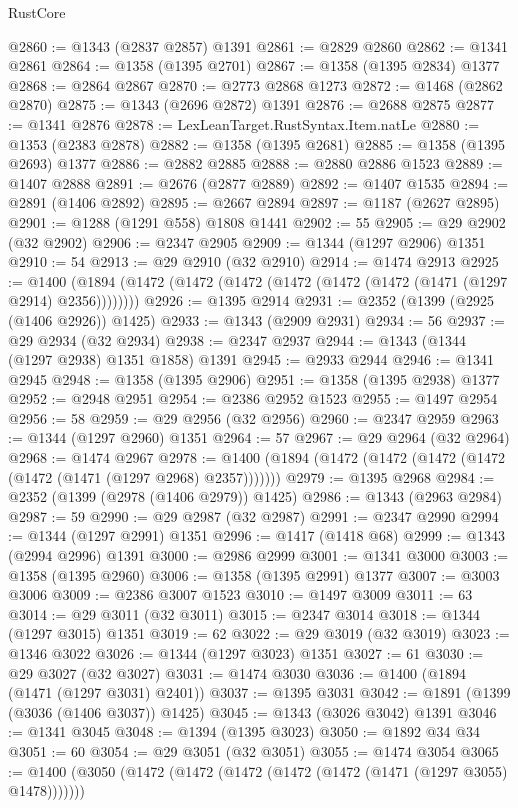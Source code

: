 \begin{lexlean}{RustCore}
\begin{coremodule}
{\begin{coremodule}
{{{{{{{{{{{{{{{{{{{{{{{{{{{{{{{{{{{{{{{{{{{{@2860 := @1343 (@2837 @2857) @1391
@2861 := @2829 @2860
@2862 := @1341 @2861
@2864 := @1358 (@1395 @2701)
@2867 := @1358 (@1395 @2834) @1377
@2868 := @2864 @2867
@2870 := @2773 @2868 @1273
@2872 := @1468 (@2862 @2870)
@2875 := @1343 (@2696 @2872) @1391
@2876 := @2688 @2875
@2877 := @1341 @2876
@2878 := LexLeanTarget.RustSyntax.Item.natLe
@2880 := @1353 (@2383 @2878)
@2882 := @1358 (@1395 @2681)
@2885 := @1358 (@1395 @2693) @1377
@2886 := @2882 @2885
@2888 := @2880 @2886 @1523
@2889 := @1407 @2888
@2891 := @2676 (@2877 @2889)
@2892 := @1407 @1535
@2894 := @2891 (@1406 @2892)
@2895 := @2667 @2894
@2897 := @1187 (@2627 @2895)
@2901 := @1288 (@1291 @558) @1808 @1441
@2902 := 55
@2905 := @29 @2902 (@32 @2902)
@2906 := @2347 @2905
@2909 := @1344 (@1297 @2906) @1351
@2910 := 54
@2913 := @29 @2910 (@32 @2910)
@2914 := @1474 @2913
@2925 := @1400 (@1894 (@1472 (@1472 (@1472 (@1472 (@1472 (@1472 (@1471 (@1297 @2914) @2356))))))))
@2926 := @1395 @2914
@2931 := @2352 (@1399 (@2925 (@1406 @2926)) @1425)
@2933 := @1343 (@2909 @2931)
@2934 := 56
@2937 := @29 @2934 (@32 @2934)
@2938 := @2347 @2937
@2944 := @1343 (@1344 (@1297 @2938) @1351 @1858) @1391
@2945 := @2933 @2944
@2946 := @1341 @2945
@2948 := @1358 (@1395 @2906)
@2951 := @1358 (@1395 @2938) @1377
@2952 := @2948 @2951
@2954 := @2386 @2952 @1523
@2955 := @1497 @2954
@2956 := 58
@2959 := @29 @2956 (@32 @2956)
@2960 := @2347 @2959
@2963 := @1344 (@1297 @2960) @1351
@2964 := 57
@2967 := @29 @2964 (@32 @2964)
@2968 := @1474 @2967
@2978 := @1400 (@1894 (@1472 (@1472 (@1472 (@1472 (@1472 (@1471 (@1297 @2968) @2357)))))))
@2979 := @1395 @2968
@2984 := @2352 (@1399 (@2978 (@1406 @2979)) @1425)
@2986 := @1343 (@2963 @2984)
@2987 := 59
@2990 := @29 @2987 (@32 @2987)
@2991 := @2347 @2990
@2994 := @1344 (@1297 @2991) @1351
@2996 := @1417 (@1418 @68)
@2999 := @1343 (@2994 @2996) @1391
@3000 := @2986 @2999
@3001 := @1341 @3000
@3003 := @1358 (@1395 @2960)
@3006 := @1358 (@1395 @2991) @1377
@3007 := @3003 @3006
@3009 := @2386 @3007 @1523
@3010 := @1497 @3009
@3011 := 63
@3014 := @29 @3011 (@32 @3011)
@3015 := @2347 @3014
@3018 := @1344 (@1297 @3015) @1351
@3019 := 62
@3022 := @29 @3019 (@32 @3019)
@3023 := @1346 @3022
@3026 := @1344 (@1297 @3023) @1351
@3027 := 61
@3030 := @29 @3027 (@32 @3027)
@3031 := @1474 @3030
@3036 := @1400 (@1894 (@1471 (@1297 @3031) @2401))
@3037 := @1395 @3031
@3042 := @1891 (@1399 (@3036 (@1406 @3037)) @1425)
@3045 := @1343 (@3026 @3042) @1391
@3046 := @1341 @3045
@3048 := @1394 (@1395 @3023)
@3050 := @1892 @34 @34
@3051 := 60
@3054 := @29 @3051 (@32 @3051)
@3055 := @1474 @3054
@3065 := @1400 (@3050 (@1472 (@1472 (@1472 (@1472 (@1472 (@1471 (@1297 @3055) @1478)))))))
}}}}}}}}}}}}}}}}}}}}}}}}}}}}}}}}}}}}}}}}}}}}
\end{coremodule}}
\end{coremodule}
\end{lexlean}
